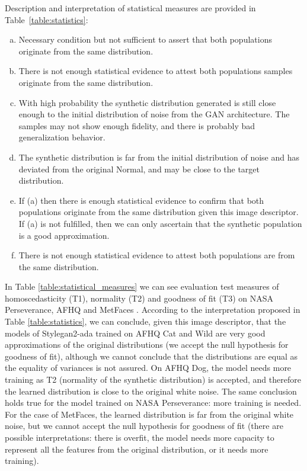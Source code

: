 \documentclass[lettersize,journal]{IEEEtran}
\begin{document}
\setlength{\tabcolsep}{1.4pt}
Description and interpretation of statistical measures are provided in Table~\ref{table:statistics}:
\begin{enumerate}[(a)]
\item Necessary condition but not sufficient to assert that both populations originate from the same distribution.
\item There is not enough statistical evidence to attest both populations samples originate from the same distribution.
\item With high probability the synthetic distribution generated is still close enough to the initial distribution of noise from the GAN architecture. The samples may not show enough fidelity, and there is probably bad generalization behavior.
\item The synthetic distribution is far from the initial distribution of noise and has deviated from the original Normal, and may be close to the target distribution.
\item If (a) then there is enough statistical evidence to confirm that both populations originate from the same distribution given this image descriptor. If (a) is not fulfilled, then we can only ascertain that the synthetic population is a good approximation.
\item There is not enough statistical evidence to attest both populations are from the same distribution.
\end{enumerate}

In Table \ref{table:statistical_measures} we can see evaluation test measures of homoscedasticity (T1), normality (T2) and goodness of fit (T3) on NASA Perseverance, AFHQ \cite{Choi2020} and MetFaces \cite{Karras2020}. According to the interpretation proposed in Table \ref{table:statistics}, we can conclude, given this image descriptor, that the models of Stylegan2-ada trained on AFHQ Cat and Wild are very good approximations of the original distributions (we accept the null hypothesis for goodness of fit), although we cannot conclude that the distributions are equal as the equality of variances is not assured. On AFHQ Dog, the model needs more training as T2 (normality of the synthetic distribution) is accepted, and therefore the learned distribution is close to the original white noise. The same conclusion holds true for the model trained on NASA Perseverance: more training is needed. For the case of MetFaces, the learned distribution is far from the original white noise, but we cannot accept the null hypothesis for goodness of fit (there are possible interpretations: there is overfit, the model needs more capacity to represent all the features from the original distribution, or it needs more training).
\end{document}
